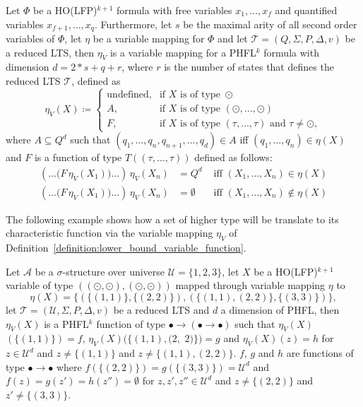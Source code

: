 \begin{definition}
    \label{definition:lower_bound_variable_function}
    Let $\Phi$ be a HO(LFP)$^{k+1}$ formula with free variables $x_1, \dots, x_f$ and quantified variables $x_{f+1}, 
    \dots, x_q$. Furthermore, let $s$ be the maximal arity of all second order variables of $\Phi$,  let $\eta$ be a
    variable mapping for $\Phi$ and let $\mathcal{T} = (Q, \Sigma, P, \Delta, v)$ be a reduced LTS, then $\eta_V$ is a 
    variable mapping for a PHFL$^k$ formula with dimension $d = 2 * s + q + r$, where $r$ is the number of states that defines the reduced LTS $\mathcal{T}$, defined as
    \[\eta_V(X)\coloneqq
    \begin{cases}
        \text{undefined}, & \text{if } X \text{ is of type } \odot \\
        A,  & \text{if } X \text{ is of type } (\odot, \dots, \odot)\\
        F, & \text{if } X \text{ is of type } (\tau, \dots, \tau) \text{ and } \tau \neq \odot,
    \end{cases}\]
    where $A \subseteq Q^d$ such that $(q_1, \dots, q_n, q_{n + 1}, \dots, q_d) \in A$ iff $(q_1, \dots, q_n) \in
    \eta(X)$ and $F$ is a function of type $T((\tau, \dots, \tau))$ defined as follows:
    \begin{align*}
        (\dots\big(F\,\eta_V(X_1)\big)\dots)\,\eta_V(X_n) &= Q^d &\text{ iff } (X_1, \dots, X_n) \in \eta(X)\\
        (\dots\big(F\,\eta_V(X_1)\big)\dots)\,\eta_V(X_n) &= \emptyset &\text{ iff } (X_1, \dots, X_n)
        \not\in \eta(X)
    \end{align*}
\end{definition}

The following example shows how a set of higher type will be translate to its characteristic function via the
variable mapping $\eta_V$ of Definition~\ref{definition:lower_bound_variable_function}.

\begin{example}
    Let $\mathcal{A}$ be a $\sigma$-structure over universe $\mathcal{U} = \{1, 2, 3\}$, let $X$ be a HO(LFP)$^{k + 1}$
    variable of type $((\odot, \odot), (\odot, \odot))$ mapped through variable mapping $\eta$ to
    \[\eta(X) = \{(\{(1, 1)\}, \{(2, 2)\}), (\{(1, 1), (2, 2)\}, \{(3, 3)\})\},\]
    let $\mathcal{T} = (\mathcal{U}, \Sigma, P, \Delta, v)$ be a reduced LTS and $d$ a dimension of PHFL, then $\eta_V(X)$ is a PHFL$^k$ function of type $\bullet \rightarrow (\bullet \rightarrow \bullet)$ such
    that $\eta_V(X)$ $(\{(1, 1)\}) = f$, $\eta_V(X)(\{(1, 1), (2, $ $2)\}) = g$ and $\eta_V(X)(z) = h$ for $z \in
    \mathcal{U}^d$ and $z \neq \{(1, 1)\}$ and $z \neq \{(1, 1), (2, 2)\}$. $f$, $g$ and $h$ are functions of type $\bullet
    \rightarrow \bullet$ where $f(\{(2, 2)\}) = g(\{(3, 3)\}) = \mathcal{U}^d$ and $f(z) = g(z') = h(z'') = \emptyset$ for $z,
    z', z'' \in \mathcal{U}^d$ and $z \neq \{(2, 2)\}$ and $z' \neq \{(3, 3)\}$.
\end{example}

